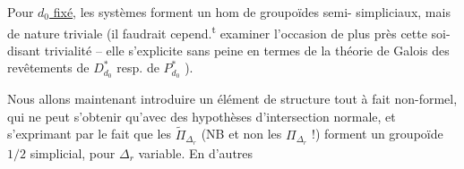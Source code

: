 Pour \uline{$d_0$ fixé}, les systèmes
forment un hom de groupoïdes semi-
simpliciaux, mais de nature 
triviale (il faudrait cepend.\textsuperscript{t} examiner
 l'occasion de plus près cette soi-disant
trivialité --  elle s'explicite sans peine
en termes de la théorie de Galois
des revêtements de $D^*_{d_0}$ resp. de $P^*_{d_0}$ \unsure{\ldots|--}).

Nous allons maintenant introduire
un élément de structure tout à fait
non-formel, qui ne peut s'obtenir
qu'avec des hypothèses 
d'intersection normale, et s'exprimant
par le fait que les $\widetilde\Pi_{\Delta_r}$ (NB et
non les $\Pi_{\Delta_r}$ !) forment un groupoïde
$1/2$ simplicial, pour $\Delta_r$ variable. En d'autres



